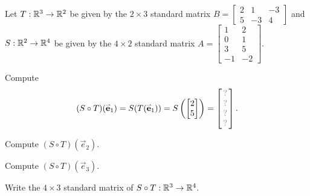 \begin{activity}{15}
Let \(T: \mathbb{R}^3 \rightarrow \mathbb{R}^2\) be given by the \(2\times 3\) standard matrix \(B=\begin{bmatrix} 2 & 1 & -3 \\ 5 & -3 & 4 \end{bmatrix}\) and \(S: \mathbb{R}^2 \rightarrow \mathbb{R}^4\) be given by the \(4\times 2\) standard matrix \(A=\begin{bmatrix} 1 & 2 \\ 0 & 1 \\ 3 & 5 \\ -1 & -2 \end{bmatrix}\).

\begin{subactivity}
Compute
\[
  (S \circ T)(\vec{e}_1)
    =
  S(T(\vec{e}_1))
    =
  S\left(\begin{bmatrix} 2 \\ 5\end{bmatrix}\right)
        =
  \begin{bmatrix}\unknown\\\unknown\\\unknown\\\unknown\end{bmatrix}.
\]

\end{subactivity}
\begin{subactivity}
Compute
\(
  (S \circ T)(\vec{e}_2)
\).
\end{subactivity}
\begin{subactivity}
Compute
\(
  (S \circ T)(\vec{e}_3)
\).
\end{subactivity}
\begin{subactivity}
Write the \(4\times 3\) standard matrix of \(S \circ T:\mathbb{R}^3\to\mathbb{R}^4\).
\end{subactivity}
\end{activity}

